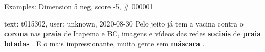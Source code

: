 \begin{frame}{Examples: Dimension 5 neg, score -5, \# 000001}
\footnotesize
\begin{alertblock}{text: t015302, user: unknown, 2020-08-30}
Pelo jeito já tem a vacina contra o \textbf{corona} nas \textbf{praia} de 
Itapema e BC, imagens e vídeos das redes \textbf{sociais} de \textbf{praia} 
\textbf{lotadas} . E o mais impressionante, muita gente sem \textbf{máscara} . 
\end{alertblock}
\end{frame}
